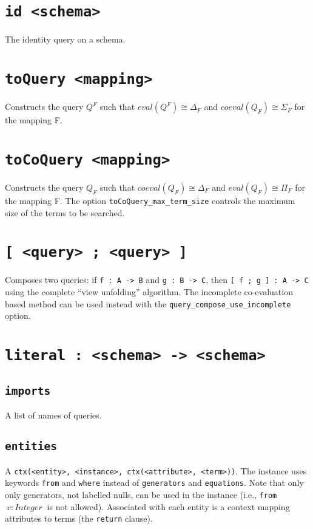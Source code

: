 \documentclass[10pt]{book}
\begin{document}
\section{{\tt id <schema>}}
The identity query on a schema.

\section{{\tt toQuery <mapping>}}
Constructs the query $Q^F$ such that $eval(Q^F) \cong \Delta_F$ and $coeval(Q_F) \cong \Sigma_F$ for the mapping F.

\section{{\tt toCoQuery <mapping>}}
Constructs the query $Q_F$ such that $coeval(Q_F) \cong \Delta_F$ and $eval(Q_F) \cong \Pi_F$ for the mapping F.  The option {\tt toCoQuery\_max\_term\_size} controls the maximum size of the terms to be searched.

\section{{\tt [ <query> ; <query> ]}}
Composes two queries: if {\tt f : A -> B} and {\tt g : B -> C}, then {\tt [ f ; g ] : A -> C} using the complete ``view unfolding'' algorithm.   The incomplete co-evaluation based method can be used instead with the {\tt query\_compose\_use\_incomplete} option.

\section{{\tt literal : <schema> -> <schema>}}
\subsection{{\tt imports}}
A list of names of queries.
\subsection{{\tt entities}}
A {\tt ctx(<entity>, <instance>, ctx(<attribute>, <term>))}.  The instance uses keywords {\tt from} and {\tt where} instead of {\tt generators} and {\tt equations}.  Note that only only generators, not labelled nulls, can be used in the instance (i.e., {\tt from} $\ v:Integer \ $ is not allowed).  Associated with each entity is a context mapping attributes to terms (the {\tt return} clause).
\end{document}
